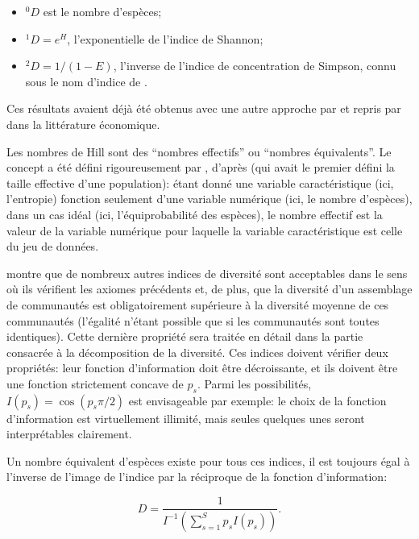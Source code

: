 \documentclass[
  11pt,
  american,
  a4paper,
  extrafontsizes,onecolumn,openright
  ]{memoir}
\providecommand{\tightlist}{%
  \setlength{\itemsep}{0pt}\setlength{\parskip}{0pt}}
\begin{document}
\begin{itemize}
\tightlist
\item
  \(^{0}\!D\) est le nombre d'espèces;
\item
  \(^{1}\!D = e^H\), l'exponentielle de l'indice de Shannon;
\item
  \(^{2}\!D = {1} / {(1- E)}\), l'inverse de l'indice de concentration de Simpson, connu sous le nom d'indice de \textcite{Stoddart1983}.
\end{itemize}

Ces résultats avaient déjà été obtenus avec une autre approche par \textcite{MacArthur1965} et repris par \textcite{Adelman1969} dans la littérature économique.

Les nombres de Hill sont des \enquote{nombres effectifs} ou \enquote{nombres équivalents}.
Le concept a été défini rigoureusement par \textcite{Gregorius1991}, d'après \textcite{Wright1931} (qui avait le premier défini la taille effective d'une population): étant donné une variable caractéristique (ici, l'entropie) fonction seulement d'une variable numérique (ici, le nombre d'espèces), dans un cas idéal (ici, l'équiprobabilité des espèces), le nombre effectif est la valeur de la variable numérique pour laquelle la variable caractéristique est celle du jeu de données.

\textcite{Gregorius2014} montre que de nombreux autres indices de diversité sont acceptables dans le sens où ils vérifient les axiomes précédents et, de plus, que la diversité d'un assemblage de communautés est obligatoirement supérieure à la diversité moyenne de ces communautés (l'égalité n'étant possible que si les communautés sont toutes identiques).
Cette dernière propriété sera traitée en détail dans la partie consacrée à la décomposition de la diversité.
Ces indices doivent vérifier deux propriétés: leur fonction d'information doit être décroissante, et ils doivent être une fonction strictement concave de \(p_s\).
Parmi les possibilités, \(I(p_s) = \cos{(p_s \pi / 2)}\) est envisageable par exemple: le choix de la fonction d'information est virtuellement illimité, mais seules quelques unes seront interprétables clairement.

Un nombre équivalent d'espèces existe pour tous ces indices, il est toujours égal à l'inverse de l'image de l'indice par la réciproque de la fonction d'information:

\begin{equation}
  \label{eq:Gregorius2014}
  D = \frac{1}{I^{-1} \left( \sum^S_{s=1}{p_s I(p_s)} \right)}.
\end{equation}
\end{document}

